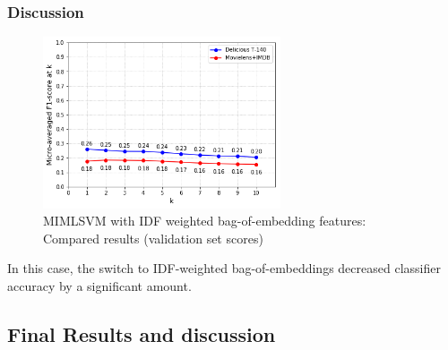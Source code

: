 \subsubsection{Discussion}

\begin{figure}[H]
    \centering
    \includegraphics[width=7cm]{chapters/05_experiments/images/proposal-2-compared-3.png}
    \caption{MIMLSVM with IDF weighted bag-of-embedding features: Compared results (validation set scores)}
    \label{fig:compared_mimlsvm_lda}
\end{figure}

In this case, the switch to IDF-weighted bag-of-embeddings decreased classifier accuracy by a significant amount.

\subsection{Final Results and discussion}\label{sub:final_results_prop_2}

